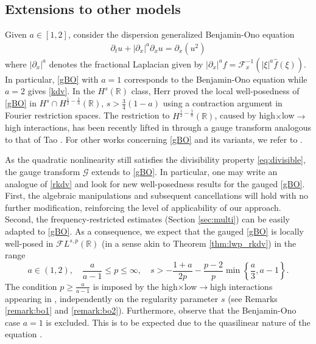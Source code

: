 \documentclass[%
11pt,  reqno]{amsart}
\newcommand{\red}{\color{red}}
\newcommand{\5}{\textup{V}}
\newcommand{\noi}{\noindent}
\newcommand{\FL}{\mathcal{F} L}
\newcommand{\ft}{\widehat}
\newcommand{\dx}{\partial_x}
\newcommand{\dt}{\partial_t}
\theoremstyle{remark}
\newtheorem{remark}[theorem]{Remark}
\newcommand{\R}{\mathbb{R}}
\newcommand{\Ft}{{\mathcal{F}}}
\newcommand{\Gc}{\mathcal{G}}
\numberwithin{equation}{section}
\numberwithin{theorem}{section}
\newcommand{\simao}[1]{\marginpar{\color{red} $\Leftarrow\Leftarrow\Leftarrow$}{\smallskip \noi\color{red}SIMAO: #1}\smallskip}
\begin{document}

        
       
		
		

    

\subsection{Extensions to other models}
\label{sec:dgbo}

Given $a \in [1,2]$, consider the dispersion generalized Benjamin-Ono equation
\begin{align}
\label{gBO}\tag{dgBO}
\dt u + |\dx|^a \dx u = \dx (u^2)
\end{align}
where $|\dx|^a$ denotes the fractional Laplacian given by $|\dx|^a f = \Ft_{x}^{-1} (|\xi|^a \ft f (\xi))$. 
In particular, \eqref{gBO} with $a=1$ corresponds to the Benjamin-Ono equation while $a=2$ gives \eqref{kdv}. In the $H^s(\R)$ class, Herr \cite{herr_bo} proved the local well-posedness of \eqref{gBO} in $H^s\cap H^{\frac12-\frac 1a}(\R)$, $s>\frac{3}{4}(1-a)$ using a contraction argument in Fourier restriction spaces. The restriction to $H^{\frac12-\frac 1a}(\R)$, caused by high$\times$low$\to$high interactions, has been recently lifted in \cite{AiLiu} through a gauge transform analogous to that of Tao \cite{tao_bo}. For other works concerning \eqref{gBO} and its variants, we refer to \cite{CamposLinaresSantos, FarahLinaresPastor_bo, Jockel, KenigMartelRobbiano}.

As the quadratic nonlinearity still satisfies the divisibility property \eqref{eq:divisible},  the gauge transform $\Gc$ extends to \eqref{gBO}.  
In particular, one may write an analogue of \eqref{rkdv} and look for new well-posedness results for the gauged \eqref{gBO}. First, the algebraic manipulations and subsequent cancellations will hold with no further modification, reinforcing the level of applicability of our approach. Second, the frequency-restricted estimates (Section \ref{sec:multi}) can be easily adapted to \eqref{gBO}. As a consequence, we expect that the gauged \eqref{gBO} is locally well-posed in $\FL^{s,p}(\R)$ (in a sense akin to Theorem \ref{thm:lwp_rkdv}) in the range
\begin{equation}\label{eq:condicoes_bo}
a\in (1,2),\quad \frac{a}{a-1}\le p \le \infty,\quad s>-\frac{1+a}{2p} - \frac{p-2}{p}\min\left\{\frac{a}3, a-1\right\}.
\end{equation}
The condition $p\ge \frac{a}{a-1}$ is imposed by the high$\times$low$\to$high interactions appearing in \cite{herr_bo}, independently on the regularity parameter $s$ (see Remarks \ref{remark:bo1} and \ref{remark:bo2}). Furthermore, observe that the Benjamin-Ono case $a=1$ is excluded. This is to be expected due to the quasilinear nature of the equation \cite{KillipVisan_bo, tao_bo}.
\end{document}
